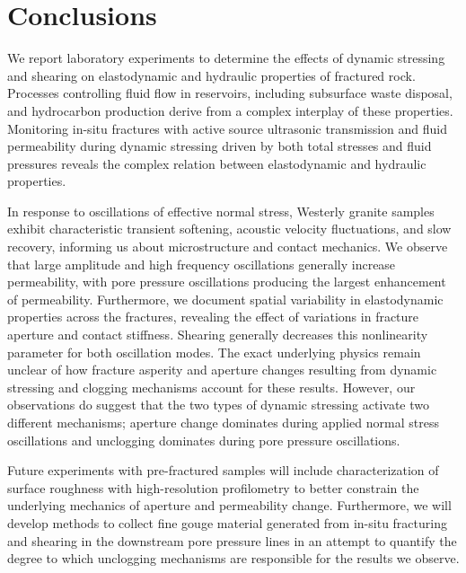 \documentclass[draft]{agujournal2019}
\begin{document}
\section{Conclusions}

We  report laboratory experiments to determine the effects of dynamic stressing and shearing on elastodynamic and hydraulic properties of fractured rock. Processes controlling fluid flow in reservoirs, including subsurface waste disposal, and hydrocarbon production derive from a complex interplay of these properties. Monitoring in-situ fractures with active source ultrasonic transmission and fluid permeability during dynamic stressing driven by both total stresses and fluid pressures reveals the complex relation between elastodynamic and hydraulic properties. 

In response to oscillations of effective normal stress, Westerly granite samples exhibit characteristic transient softening, acoustic velocity fluctuations, and slow recovery, informing us about microstructure and contact mechanics. We observe that large amplitude and high frequency oscillations generally increase permeability, with pore pressure oscillations producing the largest enhancement of permeability. Furthermore, we document spatial variability in elastodynamic properties across the fractures, revealing the effect of variations in fracture aperture and contact stiffness. Shearing generally decreases this nonlinearity parameter for both oscillation modes.
The exact underlying physics remain unclear of how fracture asperity and aperture changes resulting from dynamic stressing and clogging mechanisms account for these results. However, our observations do suggest that the two types of dynamic stressing activate two different mechanisms; aperture change dominates during applied normal stress oscillations and unclogging dominates during pore pressure oscillations. 

Future experiments with pre-fractured samples will include characterization of surface roughness with high-resolution profilometry to better constrain the underlying mechanics of aperture and permeability change. Furthermore, we will develop methods to collect fine gouge material generated from in-situ fracturing and shearing in the downstream pore pressure lines in an attempt to quantify the degree to which unclogging mechanisms are responsible for the results we observe.
\clearpage
\end{document}
